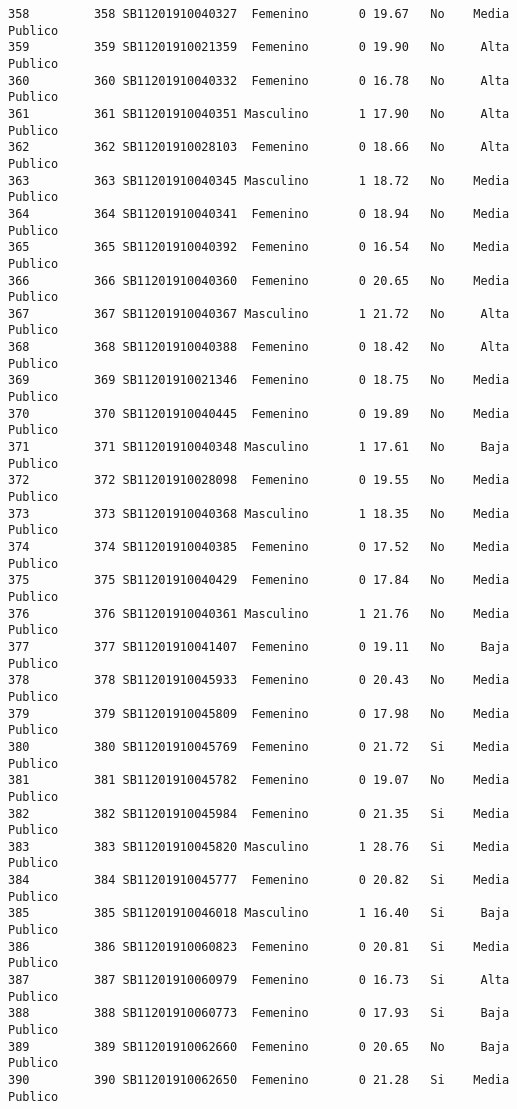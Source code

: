 \documentclass[
  letterpaper,
  DIV=11,
  numbers=noendperiod]{scrartcl}
\begin{document}
\begin{verbatim}
358         358 SB11201910040327  Femenino       0 19.67   No    Media Publico
359         359 SB11201910021359  Femenino       0 19.90   No     Alta Publico
360         360 SB11201910040332  Femenino       0 16.78   No     Alta Publico
361         361 SB11201910040351 Masculino       1 17.90   No     Alta Publico
362         362 SB11201910028103  Femenino       0 18.66   No     Alta Publico
363         363 SB11201910040345 Masculino       1 18.72   No    Media Publico
364         364 SB11201910040341  Femenino       0 18.94   No    Media Publico
365         365 SB11201910040392  Femenino       0 16.54   No    Media Publico
366         366 SB11201910040360  Femenino       0 20.65   No    Media Publico
367         367 SB11201910040367 Masculino       1 21.72   No     Alta Publico
368         368 SB11201910040388  Femenino       0 18.42   No     Alta Publico
369         369 SB11201910021346  Femenino       0 18.75   No    Media Publico
370         370 SB11201910040445  Femenino       0 19.89   No    Media Publico
371         371 SB11201910040348 Masculino       1 17.61   No     Baja Publico
372         372 SB11201910028098  Femenino       0 19.55   No    Media Publico
373         373 SB11201910040368 Masculino       1 18.35   No    Media Publico
374         374 SB11201910040385  Femenino       0 17.52   No    Media Publico
375         375 SB11201910040429  Femenino       0 17.84   No    Media Publico
376         376 SB11201910040361 Masculino       1 21.76   No    Media Publico
377         377 SB11201910041407  Femenino       0 19.11   No     Baja Publico
378         378 SB11201910045933  Femenino       0 20.43   No    Media Publico
379         379 SB11201910045809  Femenino       0 17.98   No    Media Publico
380         380 SB11201910045769  Femenino       0 21.72   Si    Media Publico
381         381 SB11201910045782  Femenino       0 19.07   No    Media Publico
382         382 SB11201910045984  Femenino       0 21.35   Si    Media Publico
383         383 SB11201910045820 Masculino       1 28.76   Si    Media Publico
384         384 SB11201910045777  Femenino       0 20.82   Si    Media Publico
385         385 SB11201910046018 Masculino       1 16.40   Si     Baja Publico
386         386 SB11201910060823  Femenino       0 20.81   Si    Media Publico
387         387 SB11201910060979  Femenino       0 16.73   Si     Alta Publico
388         388 SB11201910060773  Femenino       0 17.93   Si     Baja Publico
389         389 SB11201910062660  Femenino       0 20.65   No     Baja Publico
390         390 SB11201910062650  Femenino       0 21.28   Si    Media Publico

\end{verbatim}
\end{document}
